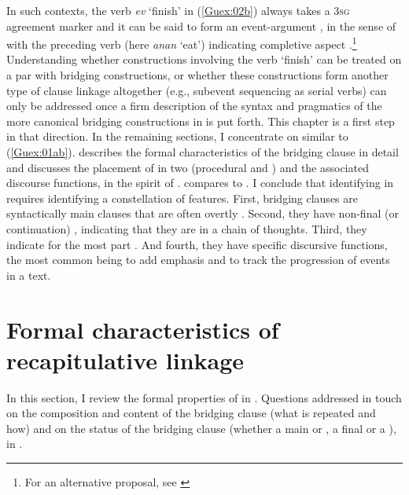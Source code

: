 \documentclass[output=paper]{LSP/langsci}
\begin{document}
In such contexts, the verb \textit{ev} `finish' in (\ref{Guex:02b}) always takes a \textsc{3sg} agreement marker and it can be said to form an event-argument , in the sense of \citet[][18]{aikhenvald2006serial}  with the preceding verb (here \textit{anan} `eat') indicating completive aspect \citep[][225, 267]{guerin11}.\footnote{For an alternative proposal, see \citet[][131, 241]{cleary15}} Understanding whether constructions involving the verb `finish' can be treated on a par with bridging constructions, or whether these constructions form another type of clause linkage altogether (e.g., subevent sequencing as serial verbs) can only be addressed once a firm description of the syntax and pragmatics of the more canonical bridging constructions in  is put forth. This chapter is a first step in that direction. In the remaining sections, I concentrate on  similar to (\ref{Guex:01ab}).   describes the formal characteristics of the bridging clause in detail and  discusses the placement of  in two  (procedural and ) and the associated discourse functions, in the spirit of \citet{devries.2005}.  compares  to . I conclude that identifying  in  requires identifying a constellation of features. First, bridging clauses are syntactically main clauses that are often overtly . Second, they have non-final (or continuation) , indicating that they are in a chain of thoughts. Third, they indicate for the most part . And fourth, they have specific discursive functions, the most common being to add emphasis and to track the progression of events in a text.


\section{Formal characteristics of recapitulative linkage} 
\label{Gusec:recapitulative}
In this section, I review the formal properties of  in . Questions addressed in  touch on the composition and content of the bridging clause (what is repeated and how) and on the status of the bridging clause (whether a main or , a final or a ), in .
\end{document}
